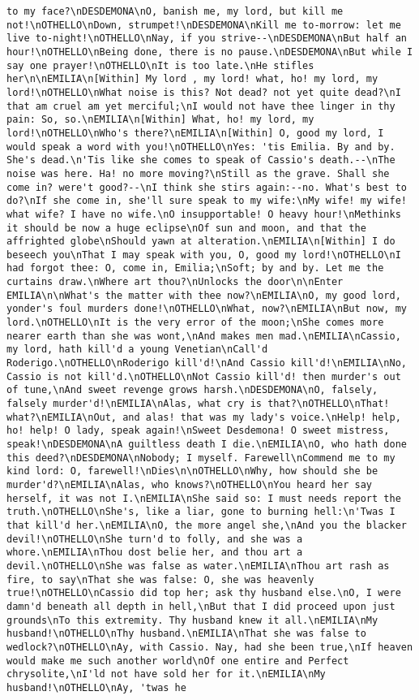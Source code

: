 \begin{verbatim}
to my face?\nDESDEMONA\nO, banish me, my lord, but kill me not!\nOTHELLO\nDown, strumpet!\nDESDEMONA\nKill me to-morrow: let me live to-night!\nOTHELLO\nNay, if you strive--\nDESDEMONA\nBut half an hour!\nOTHELLO\nBeing done, there is no pause.\nDESDEMONA\nBut while I say one prayer!\nOTHELLO\nIt is too late.\nHe stifles her\n\nEMILIA\n[Within] My lord , my lord! what, ho! my lord, my lord!\nOTHELLO\nWhat noise is this? Not dead? not yet quite dead?\nI that am cruel am yet merciful;\nI would not have thee linger in thy pain: So, so.\nEMILIA\n[Within] What, ho! my lord, my lord!\nOTHELLO\nWho's there?\nEMILIA\n[Within] O, good my lord, I would speak a word with you!\nOTHELLO\nYes: 'tis Emilia. By and by. She's dead.\n'Tis like she comes to speak of Cassio's death.--\nThe noise was here. Ha! no more moving?\nStill as the grave. Shall she come in? were't good?--\nI think she stirs again:--no. What's best to do?\nIf she come in, she'll sure speak to my wife:\nMy wife! my wife! what wife? I have no wife.\nO insupportable! O heavy hour!\nMethinks it should be now a huge eclipse\nOf sun and moon, and that the affrighted globe\nShould yawn at alteration.\nEMILIA\n[Within] I do beseech you\nThat I may speak with you, O, good my lord!\nOTHELLO\nI had forgot thee: O, come in, Emilia;\nSoft; by and by. Let me the curtains draw.\nWhere art thou?\nUnlocks the door\n\nEnter EMILIA\n\nWhat's the matter with thee now?\nEMILIA\nO, my good lord, yonder's foul murders done!\nOTHELLO\nWhat, now?\nEMILIA\nBut now, my lord.\nOTHELLO\nIt is the very error of the moon;\nShe comes more nearer earth than she was wont,\nAnd makes men mad.\nEMILIA\nCassio, my lord, hath kill'd a young Venetian\nCall'd Roderigo.\nOTHELLO\nRoderigo kill'd!\nAnd Cassio kill'd!\nEMILIA\nNo, Cassio is not kill'd.\nOTHELLO\nNot Cassio kill'd! then murder's out of tune,\nAnd sweet revenge grows harsh.\nDESDEMONA\nO, falsely, falsely murder'd!\nEMILIA\nAlas, what cry is that?\nOTHELLO\nThat! what?\nEMILIA\nOut, and alas! that was my lady's voice.\nHelp! help, ho! help! O lady, speak again!\nSweet Desdemona! O sweet mistress, speak!\nDESDEMONA\nA guiltless death I die.\nEMILIA\nO, who hath done this deed?\nDESDEMONA\nNobody; I myself. Farewell\nCommend me to my kind lord: O, farewell!\nDies\n\nOTHELLO\nWhy, how should she be murder'd?\nEMILIA\nAlas, who knows?\nOTHELLO\nYou heard her say herself, it was not I.\nEMILIA\nShe said so: I must needs report the truth.\nOTHELLO\nShe's, like a liar, gone to burning hell:\n'Twas I that kill'd her.\nEMILIA\nO, the more angel she,\nAnd you the blacker devil!\nOTHELLO\nShe turn'd to folly, and she was a whore.\nEMILIA\nThou dost belie her, and thou art a devil.\nOTHELLO\nShe was false as water.\nEMILIA\nThou art rash as fire, to say\nThat she was false: O, she was heavenly true!\nOTHELLO\nCassio did top her; ask thy husband else.\nO, I were damn'd beneath all depth in hell,\nBut that I did proceed upon just grounds\nTo this extremity. Thy husband knew it all.\nEMILIA\nMy husband!\nOTHELLO\nThy husband.\nEMILIA\nThat she was false to wedlock?\nOTHELLO\nAy, with Cassio. Nay, had she been true,\nIf heaven would make me such another world\nOf one entire and Perfect chrysolite,\nI'ld not have sold her for it.\nEMILIA\nMy husband!\nOTHELLO\nAy, 'twas he 
\end{verbatim}
